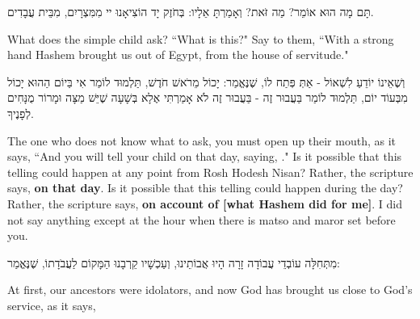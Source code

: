 תָּם מָה הוּא אוֹמֵר? מַה זֹּאת? וְאָמַרְתָּ אֵלָיו: בְּחֹזֶק יָד הוֹצִיאָנוּ יי מִמִּצְרָיִם, מִבֵּית עֲבָדִים.

\begin{english}
What does the simple child ask? ``What is this?" Say to them, ``With a strong hand Hashem brought us out of Egypt, from the house of servitude."
\end{english}

וְשֶׁאֵינוֹ יוֹדֵעַ לִשְׁאוֹל - אַתְּ פְּתַח לוֹ, שֶׁנֶּאֱמַר: 
יָכוֹל מֵרֹאשׁ חֹדֶשׁ, תַּלְמוּד לוֹמַר 
 אִי בַּיוֹם הַהוּא יָכוֹל מִבְּעוֹד יוֹם, תַּלְמוּד לוֹמַר בַּעֲבוּר זֶה - בַּעֲבוּר זֶה לֹא אָמַרְתִּי אֶלָא בְּשָׁעָה שֶׁיֵּשׁ מַצָּה וּמָרוֹר מֻנָּחִים לְפָנֶיךָ.

\begin{english}
The one who does not know what to ask, you must open up their mouth, as it says, ``And you will tell your child on that day, saying, ." Is it possible that this telling could happen at any point from Rosh Hodesh Nisan? Rather, the scripture says, {\bfseries on that day}. Is it possible that this telling could happen during the day? Rather, the scripture says, {\bfseries on account of [what Hashem did for me]}. I did not say anything except at the hour when there is matso and maror set before you.
\end{english}

\vspace{1em}

מִתְּחִלָּה עוֹבְדֵי עֲבוֹדָה זָרָה הָיוּ אֲבוֹתֵינוּ, וְעַכְשָׁיו קֵרְבָנוּ הַמָּקוֹם לַעֲבֹדָתוֹ, שֶׁנֶּאֱמַר:

\begin{english}
At first, our ancestors were idolators, and now God has brought us close to God's service, as it says, 
\end{english}

